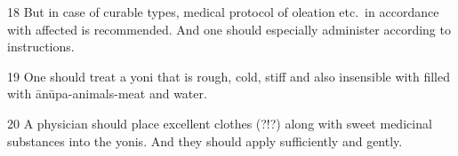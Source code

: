 \begin{translation}
\item [18]
But in case of curable types, medical protocol of oleation etc.\ in accordance with affected  is recommended.
And one should especially administer  according to instructions.

\item [19]
One should treat a yoni that is rough, cold, stiff and also insensible with  filled with ānūpa-animals-meat and water.

\item [20]
A physician should place excellent clothes (?!?) along with sweet medicinal substances into the yonis. And they should apply  sufficiently and gently.


\end{translation}
